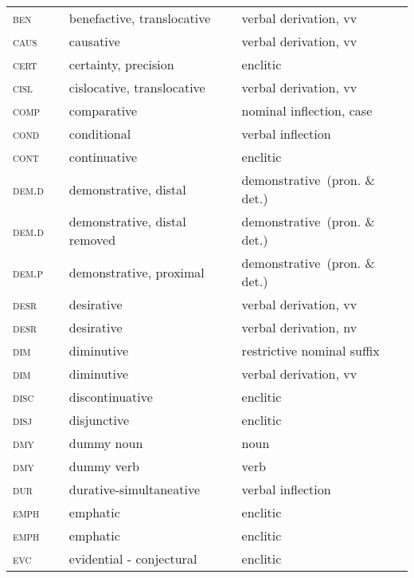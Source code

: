 \begin{refsection}
\begin{small}
\begin{longtable}{*{4}{@{\hspace{1ex}}l}@{\hspace{1ex}}}
\textsc{ben} 	&  		& benefactive, translocative 		& verbal derivation, vv\\
\textsc{caus} 	&  		& causative 				& verbal derivation, vv\\
\textsc{cert} 		&  	& certainty, precision 			& enclitic\\
\textsc{cisl} 		&  		& cislocative, translocative 		& verbal derivation, vv\\
\textsc{comp} 		&  	& comparative 				& nominal inflection, case\\
\textsc{cond} 		&  	& conditional 				& verbal inflection\\
\textsc{cont} 		& 		& continuative 				& enclitic\\
\textsc{dem.d} 		&  		& demonstrative, distal 		& demonstrative~(pron. \&{} det.)\\
\textsc{dem.d}  	&  		& demonstrative, distal removed 	& demonstrative~(pron. \&{} det.)\\
\textsc{dem.p} 		&  		& demonstrative, proximal 		& demonstrative~(pron. \&{} det.)\\
\textsc{desr} 		&  	& desirative 				& verbal derivation, vv\\
\textsc{desr} 		&  	& desirative 				& verbal derivation, nv\\
\textsc{dim} 	&  	& diminutive 				& restrictive nominal suffix\\
\textsc{dim} 	&  	& diminutive 				& verbal derivation, vv\\
\textsc{disc} 		&  	& discontinuative 			& enclitic\\
\textsc{disj} 		&  	& disjunctive 				& enclitic\\
\textsc{dmy} 	&  		& dummy noun 				& noun\\
\textsc{dmy} 	&  		& dummy verb 				& verb\\
\textsc{dur}		&  	& durative-simultaneative 		& verbal inflection\\
\textsc{emph} 	& 		& emphatic 				& enclitic\\
\textsc{emph} 	&  		& emphatic 				& enclitic \\
\textsc{evc} 		&  		& evidential - conjectural 		& enclitic\\

\end{longtable}
\end{small}
\end{refsection}
